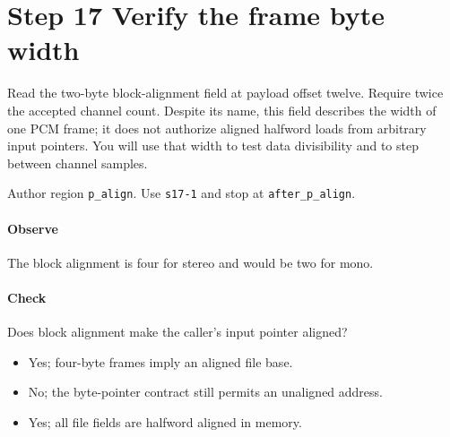 \section{Step 17 Verify the frame byte width}\label{pcm-wav-s17}
Read the two-byte block-alignment field at payload offset twelve. Require twice the accepted channel count. Despite its name, this field describes the width of one PCM frame; it does not authorize aligned halfword loads from arbitrary input pointers. You will use that width to test data divisibility and to step between channel samples.

Author region \texttt{p\_align}. Use \texttt{s17-1} and stop at \texttt{after\_p\_align}.

\paragraph{Observe} The block alignment is four for stereo and would be two for mono.

\paragraph{Check} Does block alignment make the caller's input pointer aligned?
\begin{itemize}
  \item[A.] Yes; four-byte frames imply an aligned file base.
  \item[B.] No; the byte-pointer contract still permits an unaligned address.
  \item[C.] Yes; all file fields are halfword aligned in memory.
\end{itemize}
